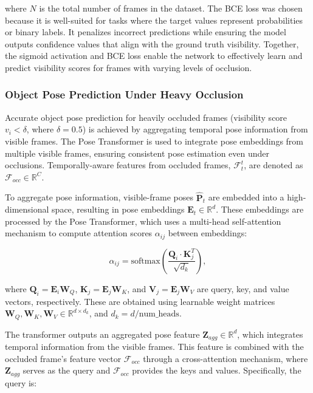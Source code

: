 \noindent where $N$ is the total number of frames in the dataset. The BCE loss was chosen because it is well-suited for tasks where the target values represent probabilities or binary labels. It penalizes incorrect predictions while ensuring the model outputs confidence values that align with the ground truth visibility. Together, the sigmoid activation and BCE loss enable the network to effectively learn and predict visibility scores for frames with varying levels of occlusion.

\subsubsection{Object Pose Prediction Under Heavy Occlusion}

Accurate object pose prediction for heavily occluded frames (visibility score $v_i < \delta$, where $\delta = 0.5$) is achieved by aggregating temporal pose information from visible frames. The Pose Transformer is used to integrate pose embeddings from multiple visible frames, ensuring consistent pose estimation even under occlusions. Temporally-aware features from occluded frames, $\mathcal{F}^t_t$, are denoted as $\mathcal{F}_{occ} \in \mathbb{R}^C$.

To aggregate pose information, visible-frame poses $\hat{\mathbf{P}}_t$ are embedded into a high-dimensional space, resulting in pose embeddings $\mathbf{E}_t \in \mathbb{R}^d$. These embeddings are processed by the Pose Transformer, which uses a multi-head self-attention mechanism to compute attention scores $\alpha_{ij}$ between embeddings:

\begin{equation}
\alpha_{ij} = \text{softmax}\left(\frac{\mathbf{Q}_i \cdot \mathbf{K}_j^T}{\sqrt{d_k}}\right),
\end{equation}

\noindent where $\mathbf{Q}_i = \mathbf{E}_i \mathbf{W}_Q$, $\mathbf{K}_j = \mathbf{E}_j \mathbf{W}_K$, and $\mathbf{V}_j = \mathbf{E}_j \mathbf{W}_V$ are query, key, and value vectors, respectively. These are obtained using learnable weight matrices $\mathbf{W}_Q, \mathbf{W}_K, \mathbf{W}_V \in \mathbb{R}^{d \times d_k}$, and $d_k = d / \text{num\_heads}$.

The transformer outputs an aggregated pose feature $\mathbf{Z}_{agg} \in \mathbb{R}^d$, which integrates temporal information from the visible frames. This feature is combined with the occluded frame's feature vector $\mathcal{F}_{occ}$ through a cross-attention mechanism, where $\mathbf{Z}_{agg}$ serves as the query and $\mathcal{F}_{occ}$ provides the keys and values. Specifically, the query is:

